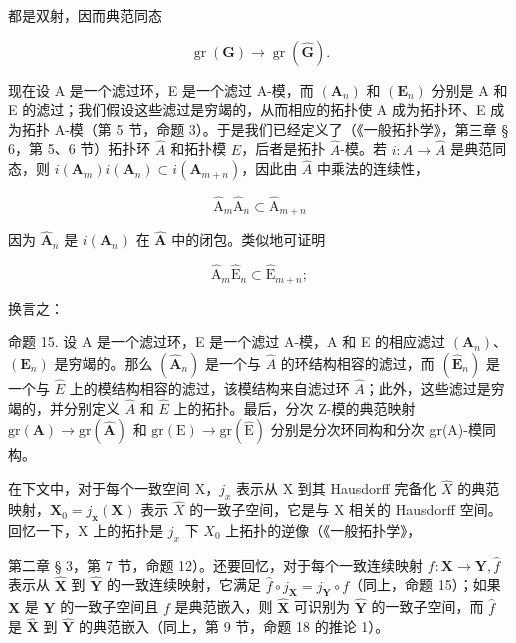 都是双射，因而典范同态

\[
\operatorname{gr} (\mathbf {G}) \rightarrow \operatorname{gr} (\hat {\mathbf {G}}).\tag{22}
\]

现在设 A 是一个滤过环，E 是一个滤过 A-模，而 \((\mathbf{A}_{n})\) 和 \((\mathbf{E}_{n})\) 分别是 A 和 E 的滤过；我们假设这些滤过是穷竭的，从而相应的拓扑使 A 成为拓扑环、E 成为拓扑 A-模（第 5 节，命题 3）。于是我们已经定义了（《一般拓扑学》，第三章 § 6，第 5、6 节）拓扑环 \(\hat{A}\) 和拓扑模 \(\hat{E}\)，后者是拓扑 \(\hat{A}\)-模。若 \(i: A \to \hat{A}\) 是典范同态，则 \(i(\mathbf{A}_{m})i(\mathbf{A}_{n}) \subset i(\mathbf{A}_{m+n})\)，因此由 \(\hat{A}\) 中乘法的连续性，

\[
\hat {\mathrm{A}} _ {m} \hat {\mathrm{A}} _ {n} \subset \hat {\mathrm{A}} _ {m + n}\tag{23}
\]

因为 \(\hat{\mathbf{A}}_n\) 是 \(i(\mathbf{A}_n)\) 在 \(\hat{\mathbf{A}}\) 中的闭包。类似地可证明

\[
\hat {\mathrm{A}} _ {m} \hat {\mathrm{E}} _ {n} \subset \hat {\mathrm{E}} _ {m + n};\tag{24}
\]

换言之：

命题 15. 设 A 是一个滤过环，E 是一个滤过 A-模，A 和 E 的相应滤过 \((\mathbf{A}_{n})\)、\((\mathbf{E}_{n})\) 是穷竭的。那么 \((\hat{\mathbf{A}}_{n})\) 是一个与 \(\hat{A}\) 的环结构相容的滤过，而 \((\hat{\mathbf{E}}_{n})\) 是一个与 \(\hat{E}\) 上的模结构相容的滤过，该模结构来自滤过环 \(\hat{A}\)；此外，这些滤过是穷竭的，并分别定义 \(\hat{A}\) 和 \(\hat{E}\) 上的拓扑。最后，分次 Z-模的典范映射 \(\mathrm{gr}(\mathbf{A}) \to \mathrm{gr}(\hat{\mathbf{A}})\) 和 \(\mathrm{gr}(\mathrm{E}) \to \mathrm{gr}(\hat{\mathrm{E}})\) 分别是分次环同构和分次 gr(A)-模同构。

在下文中，对于每个一致空间 X，\(j_{x}\) 表示从 X 到其 Hausdorff 完备化 \(\hat{X}\) 的典范映射，\(\mathbf{X}_{0}=j_{\mathbf{x}}(\mathbf{X})\) 表示 \(\hat{X}\) 的一致子空间，它是与 X 相关的 Hausdorff 空间。回忆一下，X 上的拓扑是 \(j_{x}\) 下 \(X_{0}\) 上拓扑的逆像（《一般拓扑学》，

第二章 § 3，第 7 节，命题 12）。还要回忆，对于每个一致连续映射 \(f\colon\mathbf{X}\to\mathbf{Y},\hat{f}\) 表示从 \(\hat{\mathbf{X}}\) 到 \(\hat{\mathbf{Y}}\) 的一致连续映射，它满足 \(\hat{f}\circ j_{\mathbf{X}}=j_{\mathbf{Y}}\circ f\)（同上，命题 15）；如果 \(\mathbf{X}\) 是 \(\mathbf{Y}\) 的一致子空间且 \(f\) 是典范嵌入，则 \(\hat{\mathbf{X}}\) 可识别为 \(\hat{\mathbf{Y}}\) 的一致子空间，而 \(\hat{f}\) 是 \(\hat{\mathbf{X}}\) 到 \(\hat{\mathbf{Y}}\) 的典范嵌入（同上，第 9 节，命题 18 的推论 1）。

